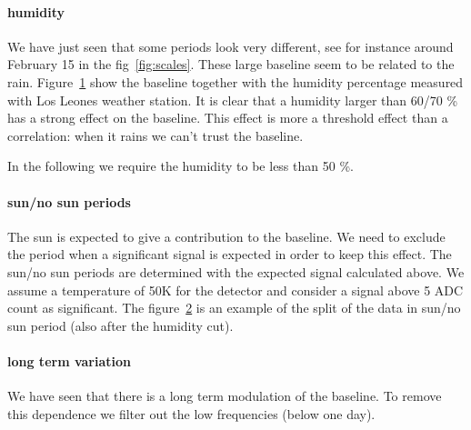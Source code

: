 \paragraph{humidity}
We  have just  seen that  some periods  look very  different,  see for
instance around  February 15 in the  fig~\ref{fig:scales}. These large
baseline seem  to be related to the  rain.  Figure~\ref{fig:rain} show
the baseline  together with the humidity percentage  measured with Los
Leones weather station. It is  clear that a humidity larger than 60/70
\%  has a  strong  effect on  the  baseline.  This  effect  is more  a
threshold effect than a correlation:  when it rains we can't trust the
baseline.
\begin{figure}[!ht]
  \centering
  \hspace*{-3ex}
  \caption{}
  \label{fig:rain}
\end{figure}
In the following we require the humidity to be less than 50 \%.


\paragraph{sun/no sun periods}
The sun is expected to give a contribution to the baseline. We need to
exclude the period  when a significant signal is  expected in order to
keep  this effect.   The sun/no  sun periods  are determined  with the
expected signal calculated  above. We assume a temperature  of 50K for
the detector and  consider a signal above 5  ADC count as significant.
The figure~\ref{fig:sunnosun} is  an example of the split  of the data
in sun/no sun period (also after the humidity cut). 
\begin{figure}[!ht]
  \centering
  \hspace*{-3ex}
  \caption{}
  \label{fig:sunnosun}
\end{figure}
\paragraph{long term variation}
We have seen that there is  a long term modulation of the baseline. To
remove this  dependence we filter  out the low frequencies  (below one
day). 

